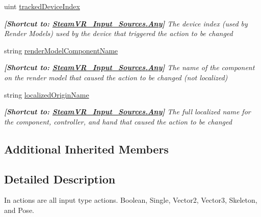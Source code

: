 \begin{DoxyCompactItemize}
uint \mbox{\hyperlink{class_valve_1_1_v_r_1_1_steam_v_r___action___in_afd572897e423daf987b7708a6d8dc890}{tracked\+Device\+Index}}
\begin{DoxyCompactList}\small\item\em {\bfseries{\mbox{[}Shortcut to\+: \mbox{\hyperlink{namespace_valve_1_1_v_r_a82e5bf501cc3aa155444ee3f0662853faed36a1ef76a59ee3f15180e0441188ad}{Steam\+V\+R\+\_\+\+Input\+\_\+\+Sources.\+Any}}\mbox{]}}} The device index (used by Render Models) used by the device that triggered the action to be changed \end{DoxyCompactList}\item 
string \mbox{\hyperlink{class_valve_1_1_v_r_1_1_steam_v_r___action___in_af302f79ecf325f6507a3aca1de536097}{render\+Model\+Component\+Name}}
\begin{DoxyCompactList}\small\item\em {\bfseries{\mbox{[}Shortcut to\+: \mbox{\hyperlink{namespace_valve_1_1_v_r_a82e5bf501cc3aa155444ee3f0662853faed36a1ef76a59ee3f15180e0441188ad}{Steam\+V\+R\+\_\+\+Input\+\_\+\+Sources.\+Any}}\mbox{]}}} The name of the component on the render model that caused the action to be changed (not localized) \end{DoxyCompactList}\item 
string \mbox{\hyperlink{class_valve_1_1_v_r_1_1_steam_v_r___action___in_a400ef60ea3cecf1cd50d8da97a00d13b}{localized\+Origin\+Name}}
\begin{DoxyCompactList}\small\item\em {\bfseries{\mbox{[}Shortcut to\+: \mbox{\hyperlink{namespace_valve_1_1_v_r_a82e5bf501cc3aa155444ee3f0662853faed36a1ef76a59ee3f15180e0441188ad}{Steam\+V\+R\+\_\+\+Input\+\_\+\+Sources.\+Any}}\mbox{]}}} The full localized name for the component, controller, and hand that caused the action to be changed \end{DoxyCompactList}\end{DoxyCompactItemize}
\subsection*{Additional Inherited Members}


\subsection{Detailed Description}
In actions are all input type actions. Boolean, Single, Vector2, Vector3, Skeleton, and Pose. 

